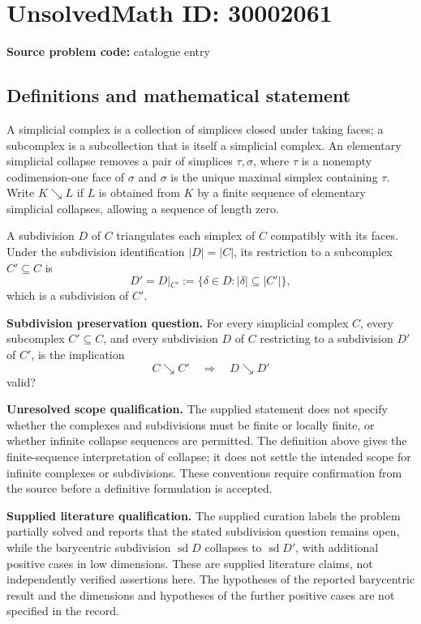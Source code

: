 \documentclass[11pt]{article}
\begin{document}
\section*{UnsolvedMath ID: 30002061}
\textbf{Source problem code:} catalogue entry
\subsection{Definitions and mathematical statement}
A simplicial complex is a collection of simplices closed under taking faces; a subcomplex is a subcollection that is itself a simplicial complex. An elementary simplicial collapse removes a pair of simplices \(\tau,\sigma\), where \(\tau\) is a nonempty codimension-one face of \(\sigma\) and \(\sigma\) is the unique maximal simplex containing \(\tau\). Write \(K\searrow L\) if \(L\) is obtained from \(K\) by a finite sequence of elementary simplicial collapses, allowing a sequence of length zero.

A subdivision \(D\) of \(C\) triangulates each simplex of \(C\) compatibly with its faces. Under the subdivision identification \(|D|=|C|\), its restriction to a subcomplex \(C'\subseteq C\) is
\[
D'=D|_{C'}:=\{\delta\in D:|\delta|\subseteq |C'|\},
\]
which is a subdivision of \(C'\).

\textbf{Subdivision preservation question.} For every simplicial complex \(C\), every subcomplex \(C'\subseteq C\), and every subdivision \(D\) of \(C\) restricting to a subdivision \(D'\) of \(C'\), is the implication
\[
C\searrow C'\quad\Longrightarrow\quad D\searrow D'
\]
valid?

\textbf{Unresolved scope qualification.} The supplied statement does not specify whether the complexes and subdivisions must be finite or locally finite, or whether infinite collapse sequences are permitted. The definition above gives the finite-sequence interpretation of collapse; it does not settle the intended scope for infinite complexes or subdivisions. These conventions require confirmation from the source before a definitive formulation is accepted.

\textbf{Supplied literature qualification.} The supplied curation labels the problem partially solved and reports that the stated subdivision question remains open, while the barycentric subdivision \(\operatorname{sd}D\) collapses to \(\operatorname{sd}D'\), with additional positive cases in low dimensions. These are supplied literature claims, not independently verified assertions here. The hypotheses of the reported barycentric result and the dimensions and hypotheses of the further positive cases are not specified in the record.
\end{document}
